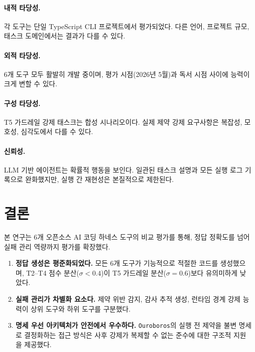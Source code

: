 \documentclass[11pt,a4paper]{article}
\newcommand{\tool}[1]{\texttt{#1}}
\begin{document}
\paragraph{내적 타당성.}
각 도구는 단일 TypeScript CLI 프로젝트에서 평가되었다. 다른 언어, 프로젝트 규모, 태스크 도메인에서는 결과가 다를 수 있다.

\paragraph{외적 타당성.}
6개 도구 모두 활발히 개발 중이며, 평가 시점(2026년 5월)과 독서 시점 사이에 능력이 크게 변할 수 있다.

\paragraph{구성 타당성.}
T5 가드레일 강제 태스크는 합성 시나리오이다. 실제 제약 강제 요구사항은 복잡성, 모호성, 심각도에서 다를 수 있다.

\paragraph{신뢰성.}
LLM 기반 에이전트는 확률적 행동을 보인다. 일관된 태스크 설명과 모든 실행 로그 기록으로 완화했지만, 실행 간 재현성은 본질적으로 제한된다.

\section{결론}
\label{sec:conclusion}

본 연구는 6개 오픈소스 AI 코딩 하네스 도구의 비교 평가를 통해, 정답 정확도를 넘어 실패 관리 역량까지 평가를 확장했다.

\begin{enumerate}
  \item \textbf{정답 생성은 평준화되었다.} 모든 6개 도구가 기능적으로 적절한 코드를 생성했으며, T2--T4 점수 분산($\sigma < 0.4$)이 T5 가드레일 분산($\sigma = 0.6$)보다 유의미하게 낮았다.

  \item \textbf{실패 관리가 차별화 요소다.} 제약 위반 감지, 감사 추적 생성, 런타임 경계 강제 능력이 상위 도구와 하위 도구를 구분했다.

  \item \textbf{명세 우선 아키텍처가 안전에서 우수하다.} \tool{Ouroboros}의 실행 전 제약을 불변 명세로 결정화하는 접근 방식은 사후 강제가 복제할 수 없는 준수에 대한 구조적 지원을 제공했다.
\end{enumerate}
\end{document}

